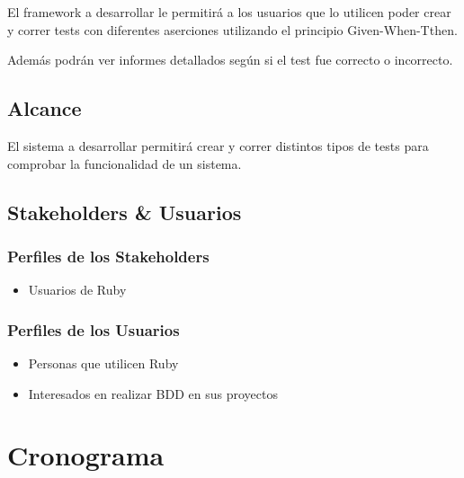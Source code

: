 \documentclass{article}
\begin{document}
El framework a desarrollar le permitirá a los usuarios que lo utilicen poder crear y correr tests con diferentes aserciones 
utilizando el principio Given-When-Tthen. \newline

Además podrán ver informes detallados según si el test fue correcto o incorrecto.

\subsection{Alcance}

El sistema a desarrollar permitirá crear y correr distintos tipos de tests para comprobar la funcionalidad de un sistema.

\subsection{Stakeholders \& Usuarios}
\subsubsection{Perfiles de los Stakeholders}
\begin{itemize}
    \item Usuarios de Ruby
\end{itemize}
\subsubsection{Perfiles de los Usuarios}
\begin{itemize}
    \item Personas que utilicen Ruby
    \item Interesados en realizar BDD en sus proyectos
\end{itemize}
\newpage

\section{Cronograma}
\newpage
\end{document}

